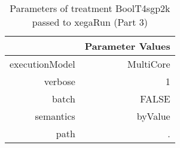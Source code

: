 \begin{table}[ht]
\centering
\begin{tabular}{rr}
  \hline
 & Parameter Values \\ 
  \hline
executionModel & MultiCore \\ 
  verbose & 1 \\ 
  batch & FALSE \\ 
  semantics & byValue \\ 
  path & . \\ 
   \hline
\end{tabular}
\caption{ Parameters of treatment BoolT4sgp2k passed to xegaRun
 (Part 3)} 
\end{table}
